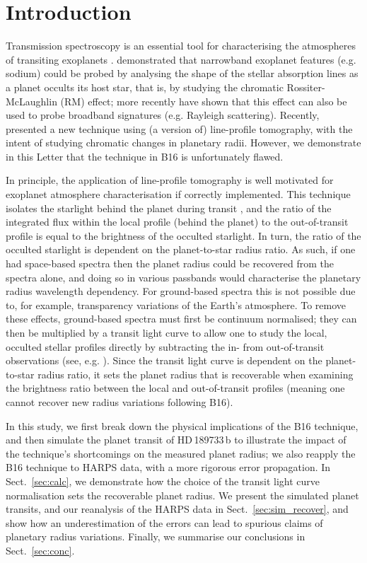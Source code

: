 \documentclass{aa}
\begin{document}
\section{Introduction}
\label{sec:intro}
Transmission spectroscopy is an essential tool for characterising the atmospheres of transiting exoplanets \citep[see e.g.][and references therein]{charbonneau02, pont13,madhusudhan14, sing16}. \cite{snellen04} demonstrated that narrowband exoplanet features (e.g. sodium) could be probed by analysing the shape of the stellar absorption lines as a planet occults its host star, that is, by studying the chromatic Rossiter-McLaughlin (RM) effect; more recently \cite{digloria15} have shown that this effect can also be used to probe broadband signatures (e.g. Rayleigh scattering). Recently, \citet[][hereafter B16]{borsa16} presented a new technique using (a version of) line-profile tomography, with the intent of studying chromatic changes in planetary radii. However, we demonstrate in this Letter that the technique in B16 is unfortunately flawed.

In principle, the application of line-profile tomography is well motivated for exoplanet atmosphere characterisation if correctly implemented. This technique isolates the starlight behind the planet during transit \citep{cameron10}, and the ratio of the integrated flux within the local profile (behind the planet) to the out-of-transit profile is equal to the brightness of the occulted starlight. In turn, the ratio of the occulted starlight is dependent on the planet-to-star radius ratio. As such, if one had space-based spectra then the planet radius could be recovered from the spectra alone, and doing so in various passbands would characterise the planetary radius wavelength dependency. For ground-based spectra this is not possible due to, for example, transparency variations of the Earth's atmosphere. To remove these effects, ground-based spectra must first be continuum normalised; they can then be multiplied by a transit light curve to allow one to study the local, occulted stellar profiles directly by subtracting the in- from out-of-transit observations (see, e.g. \citealt{cegla16b}). Since the transit light curve is dependent on the planet-to-star radius ratio, it sets the planet radius that is recoverable when examining the brightness ratio between the local and out-of-transit profiles (meaning one cannot recover new radius variations following B16). 

In this study, we first break down the physical implications of the B16 technique, and then simulate the planet transit of HD\,189733\,b to illustrate the impact of the technique's shortcomings on the measured planet radius; we also reapply the B16 technique to HARPS data, with a more rigorous error propagation. In Sect.~\ref{sec:calc}, we demonstrate how the choice of the transit light curve normalisation sets the recoverable planet radius. We present the simulated planet transits, and our reanalysis of the HARPS data in Sect.~\ref{sec:sim_recover}, and show how an underestimation of the errors can lead to spurious claims of planetary radius variations. Finally, we summarise our conclusions in Sect.~\ref{sec:conc}.
\end{document}
